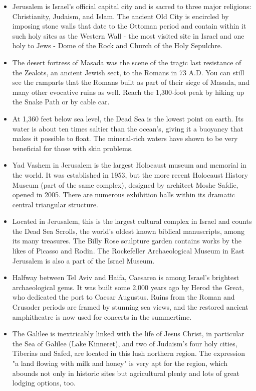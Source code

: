 \documentclass[10pt]{article}
\begin{document}
\begin{itemize}
	\item Jerusalem is Israel's official capital city and is sacred to three major religions: Christianity, Judaism, and Islam. The ancient Old City is encircled by imposing stone walls that date to the Ottoman period and contain within it such holy sites as the Western Wall - the most visited site in Israel and one holy to Jews - Dome of the Rock and Church of the Holy Sepulchre.
	\item The desert fortress of Masada was the scene of the tragic last resistance of the Zealots, an ancient Jewish sect, to the Romans in 73 A.D. You can still see the ramparts that the Romans built as part of their siege of Masada, and many other evocative ruins as well. Reach the 1,300-foot peak by hiking up the Snake Path or by cable car.
	\item At 1,360 feet below sea level,  the Dead Sea is the lowest point on earth. Its water is about ten times saltier than the ocean's, giving it a buoyancy that makes it possible to float. The mineral-rich waters have shown to be very beneficial for those with skin problems. 
	\item Yad Vashem in Jerusalem is the largest Holocaust museum and memorial in the world. It was established in 1953, but the more recent Holocaust History Museum (part of the same complex), designed by architect Moshe Safdie, opened in 2005. There are numerous exhibition halls within ​its dramatic central triangular structure.
	\item Located in Jerusalem, this is the largest cultural complex in Israel and counts the Dead Sea Scrolls, the world's oldest known biblical manuscripts, among its many treasures. The Billy Rose sculpture garden contains works by the likes of Picasso and Rodin. The Rockefeller Archaeological Museum in East Jerusalem is also a part of the Israel Museum.
	\item Halfway between Tel Aviv and Haifa, Caesarea is among Israel's brightest archaeological gems. It was built some 2,000 years ago by Herod the Great, who dedicated the port to Caesar Augustus. Ruins from the Roman and Crusader periods are framed by stunning sea views, and the restored ancient amphitheatre is now used for concerts in the summertime.
	\item The Galilee is inextricably linked with the life of Jesus Christ, in particular the Sea of Galilee (Lake Kinneret), and two of Judaism's four holy cities, Tiberias and Safed, are located in this lush northern region. The expression "a land flowing with milk and honey" is very apt for the region, which abounds not only in historic sites but agricultural plenty and lots of great lodging options, too.
\end{itemize}
\end{document}
